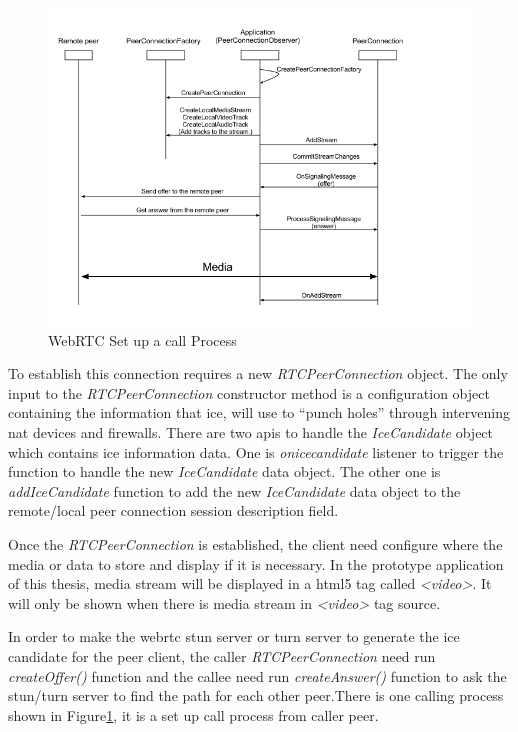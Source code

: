 \begin{figure}
	\centering
    	\includegraphics[width=0.60\textheight,natwidth=610,natheight=642]{figs/webrtc_diagram.png}
  	\caption{WebRTC Set up a call Process}
  	\label{fig:webrtc_diagram}
\end{figure}

\par To establish this connection requires a new \textit{RTCPeerConnection} object. The only input to the \textit{RTCPeerConnection} constructor method is a configuration object containing the information that \gls{ice}, will use to “punch holes” through intervening \gls{nat} devices and firewalls. There are two \gls{api}s to handle the  \textit{IceCandidate} object which contains \gls{ice} information data. One is \textit{onicecandidate} listener to trigger the function to handle the new \textit{IceCandidate} data object. The other one is \textit{addIceCandidate} function to add the new \textit{IceCandidate} data object to the remote/local peer connection session description field.

\par Once the \textit{RTCPeerConnection} is established, the client need configure where the media or data to store and display if it is necessary. In the prototype application of this thesis, media stream will be displayed in a \gls{html5} tag called \textit{<video>}. It will only be shown when there is media stream in \textit{<video>} tag source.

\par In order to make the \gls{webrtc} \gls{stun} server or \gls{turn} server to generate the \gls{ice} candidate for the peer client, the caller \textit{RTCPeerConnection} need run \textit{createOffer()} function and the callee need run \textit{createAnswer()} function  to ask the \gls{stun}/\gls{turn} server to find the path for each other peer.There is one calling process shown in Figure\ref{fig:webrtc_diagram}, it is a set up call process from caller peer.


